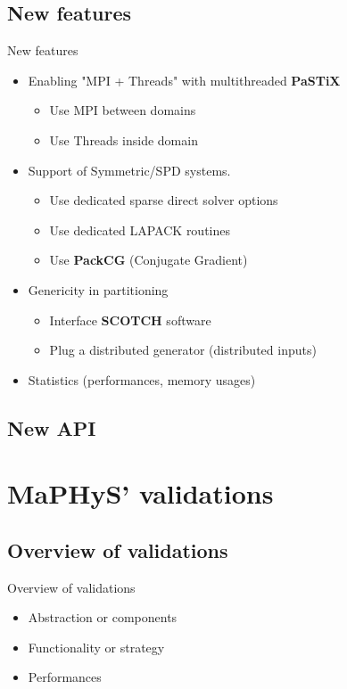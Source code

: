 \documentclass[slideopt,A4]{beamer}
\begin{document}
\subsection{New features}
\begin{frame}{New features}
   \begin{itemize}
     \item Enabling "MPI + Threads" with multithreaded {\bf PaSTiX}
          \begin{itemize}
           \item Use MPI between domains
           \item Use Threads inside domain 
          \end{itemize}
     \item Support of Symmetric/SPD systems.
       \begin{itemize}
       \item Use dedicated sparse direct solver options
       \item Use dedicated LAPACK routines
       \item Use {\bf PackCG} (Conjugate Gradient)
       \end{itemize}
     \item Genericity in partitioning
       \begin{itemize}
       \item Interface {\bf SCOTCH} software 
       \item Plug a distributed generator (distributed inputs)
       \end{itemize}
     \item Statistics (performances, memory usages) 
   \end{itemize}
\end{frame}
%
\subsection{New API}
\section{MaPHyS' validations}
\subsection{Overview of validations}
\begin{frame}{Overview of validations}
   \begin{itemize}
     \item Abstraction or components  
     \item Functionality or strategy  
     \item Performances  
   \end{itemize}
\end{frame}
\end{document}
